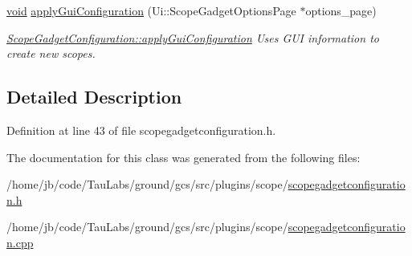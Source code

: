 \begin{DoxyCompactItemize}
\hyperlink{group___u_a_v_objects_plugin_ga444cf2ff3f0ecbe028adce838d373f5c}{void} \hyperlink{group___scope_plugin_gaa68457b9b187faa4190e2f5d1343cbbb}{apply\-Gui\-Configuration} (\-Ui\-::\-Scope\-Gadget\-Options\-Page $\ast$options\-\_\-page)
\begin{DoxyCompactList}\small\item\em \hyperlink{group___scope_plugin_gaa68457b9b187faa4190e2f5d1343cbbb}{\-Scope\-Gadget\-Configuration\-::apply\-Gui\-Configuration} \-Uses \-G\-U\-I information to create new scopes. \end{DoxyCompactList}\end{DoxyCompactItemize}


\subsection{\-Detailed \-Description}


\-Definition at line 43 of file scopegadgetconfiguration.\-h.



\-The documentation for this class was generated from the following files\-:\begin{DoxyCompactItemize}
\item 
/home/jb/code/\-Tau\-Labs/ground/gcs/src/plugins/scope/\hyperlink{scopegadgetconfiguration_8h}{scopegadgetconfiguration.\-h}\item 
/home/jb/code/\-Tau\-Labs/ground/gcs/src/plugins/scope/\hyperlink{scopegadgetconfiguration_8cpp}{scopegadgetconfiguration.\-cpp}\end{DoxyCompactItemize}
